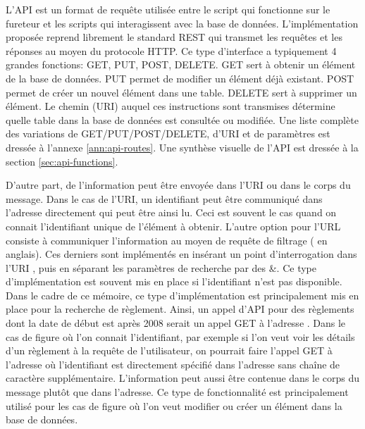 L'\ac{API} est un format de requête utilisée entre le script \fg{} qui fonctionne sur le fureteur et les scripts \fg{} qui interagissent avec la base de données. L'implémentation proposée reprend librement le standard \ac{REST} \parencite{fielding_architectural_2000} qui transmet les requêtes et les réponses au moyen du protocole \ac{HTTP}. Ce type d'interface a typiquement 4 grandes fonctions: GET, PUT, POST, DELETE. GET sert à obtenir un élément de la base de données. PUT permet de modifier un élément déjà existant. POST permet de créer un nouvel élément dans une table. DELETE sert à supprimer un élément. Le chemin (\ac{URI}) auquel ces instructions sont transmises détermine quelle table dans la base de données est consultée ou modifiée. Une liste complète des variations de GET/PUT/POST/DELETE, d'\ac{URI} et de paramètres est dressée à l'annexe \ref{ann:api-routes}. Une synthèse visuelle de l'\ac{API} est dressée à la section \ref{sec:api-functions}.\par 

D'autre part, de l'information peut être envoyée dans l'\ac{URI} ou dans le corps du message. Dans le cas de l'\ac{URI}, un identifiant peut être communiqué dans l'adresse directement qui peut être ainsi lu. Ceci est souvent le cas quand on connait l'identifiant unique de l'élément à obtenir. L'autre option pour l'URL consiste à communiquer l'information au moyen de requête de filtrage ( \fg{} en anglais). Ces derniers sont implémentés en insérant un point d'interrogation dans l'\ac{URI} , puis en séparant les paramètres de recherche par des \&. Ce type d'implémentation est souvent mis en place si l'identifiant n'est pas disponible. Dans le cadre de ce mémoire, ce type d'implémentation est principalement mis en place pour la recherche de règlement. Ainsi, un appel d'\ac{API} pour des règlements dont la date de début est après 2008 serait un appel GET à l'adresse \fg{}. Dans le cas de figure où l'on connait l'identifiant, par exemple si l'on veut voir les détails d'un règlement à la requête de l'utilisateur, on pourrait faire l'appel GET à l'adresse  \fg où l'identifiant est directement spécifié dans l'adresse sans chaîne de caractère supplémentaire. L'information peut aussi être contenue dans le corps du message plutôt que dans l'adresse. Ce type de fonctionnalité est principalement utilisé pour les cas de figure où l'on veut modifier ou créer un élément dans la base de données.\par

